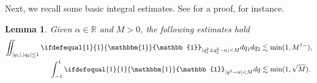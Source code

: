 \documentclass[%
11pt,  reqno]{amsart}
\newcommand{\5}{\textup{V}}
\newcommand{\m}[1]{
	\ifdefequal{#1}{1}
	{\mathbbm{#1}}
	{\mathbb{#1}}
}
\newtheorem{lemma}[theorem]{Lemma}
\theoremstyle{remark}
\newcommand{\R}{\mathbb{R}}
\numberwithin{equation}{section}
\numberwithin{theorem}{section}
\begin{document}
       Next, we recall some basic integral estimates. See \cite[Lemma 5]{COS} for a proof, for instance. 
         
		\begin{lemma}
        \label{lem:quadraticas}
			Given $\alpha\in \R$ and $M>0$, the following estimates hold
			\begin{align}
            \label{eq:posdef}
				\iint_{|q_1|, |q_2|\le 1} \m 1_{|q_1^2\pm q_2^2-\alpha|<M}dq_1dq_2 &\lesssim \min(1,M^{1-} ), \\
                \label{eq:quadratica}
				\int_{-1}^{1} \m 1_{|q^2  -\alpha | < M} dq 
                &\lesssim \min(1,\sqrt M)
                . 
                \\
			\end{align}

		\end{lemma}

		
        
            
            
\end{document}

